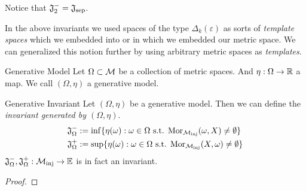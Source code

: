 \begin{myremark}{}{}
Notice that $\mathfrak{J}^-_2 = \mathfrak{J}_{\mathrm{sep}}$.
\end{myremark}



In the above invariants we used spaces of the type $\Delta_k(\varepsilon)$ as sorts of \emph{template spaces} which we embedded into or in which we embedded our metric space. We can generalized this notion further by using arbitrary metric spaces as \emph{templates}.

\begin{definition}{Generative Model}{}
Let $\Omega \subset \mathcal{M}$ be a collection of metric spaces. And $\eta: \Omega \to \mathbb R$ a map.
We call $(\Omega, \eta)$ a generative model.
\end{definition}

\begin{defprop}{Generative Invariant}{}
Let $(\Omega, \eta)$ be a generative model. Then we can define the \emph{invariant generated by $(\Omega, \eta)$}.
\begin{align*}
\mathfrak{J}^-_\Omega &:= \inf\{\eta(\omega): \omega \in \Omega \text{ s.t. } \mathrm {Mor}_{\mathcal{M}_\mathrm{inj}}(\omega, X) \neq \emptyset\} \\
\mathfrak{J}^+_\Omega &:= \sup\{\eta(\omega): \omega \in \Omega \text{ s.t. } \mathrm {Mor}_{\mathcal{M}_\mathrm{inj}}(X, \omega) \neq \emptyset\}
\end{align*}
$\mathfrak{J}^-_\Omega, \mathfrak{J}^+_\Omega: {\mathcal{M}_\mathrm{inj}} \to \mathbb E$ is in fact an invariant.
\end{defprop}
\begin{proof}
\todo
\end{proof}